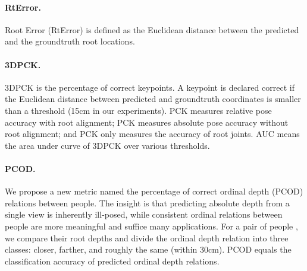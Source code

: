 \documentclass[runningheads]{llncs}
\begin{document}
\paragraph{\bf RtError.} Root Error (RtError) is defined as the Euclidean distance between the predicted and the groundtruth root locations. 

\paragraph{\bf 3DPCK.} 3DPCK is the percentage of correct keypoints. A keypoint is declared correct if the Euclidean distance between predicted and groundtruth coordinates is smaller than a threshold (15cm in our experiments). PCK measures relative pose accuracy with root alignment; PCK measures absolute pose accuracy without root alignment; and PCK only measures the accuracy of root joints. AUC means the area under curve of 3DPCK over various thresholds. 

\paragraph{\bf PCOD.} We propose a new metric named the percentage of correct ordinal depth (PCOD) relations between people. The insight is that predicting absolute depth from a single view is inherently ill-posed, while consistent ordinal relations between people are more meaningful and suffice many applications. For a pair of people , we compare their root depths and divide the ordinal depth relation into three classes: closer, farther, and roughly the same (within 30cm). PCOD equals the classification accuracy of predicted ordinal depth relations. 
\end{document}
